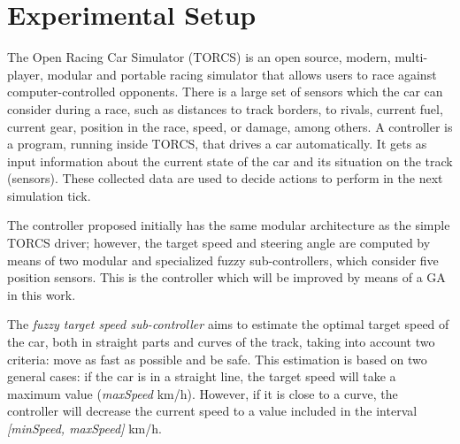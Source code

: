 \documentclass[conference]{IEEEtran}
\begin{document}

\section{Experimental Setup}
\label{sec:torcs}

The Open Racing Car Simulator (TORCS) \cite{WebTORCS} is an open source, modern, multi-player, modular and portable racing simulator that allows users to race against computer-controlled opponents.
There is a large set of sensors \cite{Torcs3} which the car can consider during a race, such as distances to track borders, to rivals, current fuel, current gear, position in the race, speed, or damage, among others.
A controller is a program, running inside TORCS, that 
drives a car automatically. It gets as input information about the current state of
the car and its situation on the track (sensors). These collected data
are used to decide actions to perform in the next simulation tick.  


The controller proposed initially \cite{evo17} has the same modular
architecture as the simple TORCS driver; however, the target speed and
steering angle are computed by means of two modular and specialized
fuzzy sub-controllers, which consider five position sensors. This is
the controller which will be improved by means of a GA in this
work.

The {\em fuzzy target speed sub-controller} aims to estimate the
optimal target speed of the car, both in straight parts and curves of
the track, taking into account two criteria: move as fast as possible
and be safe. This estimation is based on two general cases: if the car
is in a straight line, the target speed will take a maximum value
(\textit{maxSpeed} km/h). However, if it is close to a curve, the
controller will decrease the current speed to a value included in the
interval \textit{[minSpeed, maxSpeed]} km/h. 
\end{document}
